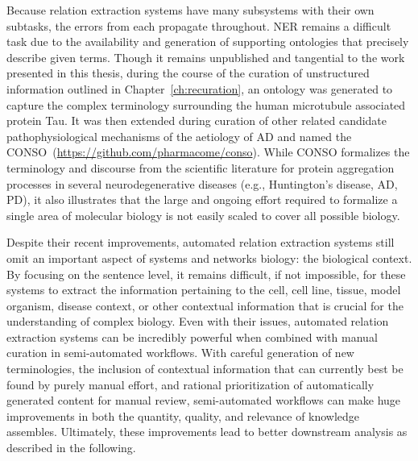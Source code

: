 Because relation extraction systems have many subsystems with their own subtasks, the errors from each propagate throughout.
\ac{NER} remains a difficult task due to the availability and generation of supporting ontologies that precisely describe given terms.
Though it remains unpublished and tangential to the work presented in this thesis, during the course of the curation of unstructured information outlined in Chapter~\ref{ch:recuration}, an ontology was generated to capture the complex terminology surrounding the human microtubule associated protein Tau.
It was then extended during curation of other related candidate pathophysiological mechanisms of the aetiology of \ac{AD} and named the \ac{CONSO}~(\url{https://github.com/pharmacome/conso}).
While \ac{CONSO} formalizes the terminology and discourse from the scientific literature for protein aggregation processes in several neurodegenerative diseases (e.g., Huntington's disease, \ac{AD}, \ac{PD}), it also illustrates that the large and ongoing effort required to formalize a single area of molecular biology is not easily scaled to cover all possible biology.

Despite their recent improvements, automated relation extraction systems still omit an important aspect of systems and networks biology: the biological context.
By focusing on the sentence level, it remains difficult, if not impossible, for these systems to extract the information pertaining to the cell, cell line, tissue, model organism, disease context, or other contextual information that is crucial for the understanding of complex biology.
Even with their issues, automated relation extraction systems can be incredibly powerful when combined with manual curation in semi-automated workflows.
With careful generation of new terminologies, the inclusion of contextual information that can currently best be found by purely manual effort, and rational prioritization of automatically generated content for manual review, semi-automated workflows can make huge improvements in both the quantity, quality, and relevance of knowledge assembles.
Ultimately, these improvements lead to better downstream analysis as described in the following.
